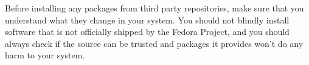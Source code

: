 Before installing any packages from third party repositories, make sure that you understand what they change in your system. You should not blindly install software that is not officially shipped by the Fedora Project, and you should always check if the source can be trusted and packages it provides won't do any harm to your system.
\endinput
